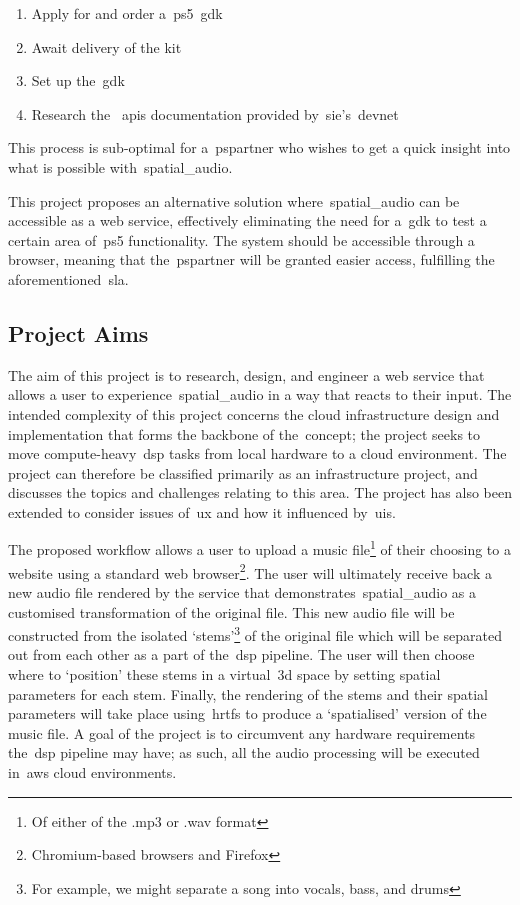 \begin{enumerate}
    \item Apply for and order a~\gls{ps5}~\gls{gdk}
    \item Await delivery of the kit
    \item Set up the~\gls{gdk}
    \item Research the ~\glspl{api} documentation provided by~\gls{sie}'s~\gls{devnet}
\end{enumerate}

This process is sub-optimal for a~\gls{pspartner} who wishes to get a quick insight into what is possible with~\gls{spatial_audio}.

This project proposes an alternative solution where~\gls{spatial_audio} can be accessible as a web service,
effectively eliminating the need for a~\gls{gdk} to test a certain area of~\gls{ps5} functionality.
The system should be accessible through a browser, meaning that the~\gls{pspartner} will be granted easier access, fulfilling the aforementioned~\gls{sla}.

\subsection{Project Aims}\label{subsec:aims}

The aim of this project is to research, design, and engineer a web service that allows a user to experience~\gls{spatial_audio} in a way that reacts to their input.
The intended complexity of this project concerns the cloud infrastructure design and implementation that forms the backbone of the\textit{}~concept;
the project seeks to move compute-heavy~\gls{dsp} tasks from local hardware to a cloud environment.
The project can therefore be classified primarily as an infrastructure project, and discusses the topics and challenges relating to this area.
The project has also been extended to consider issues of~\gls{ux} and how it influenced by~\glspl{ui}.

The proposed workflow allows a user
to upload a music file\footnote{Of either of the .mp3 or .wav format} of their choosing to a website using a standard web browser\footnote{Chromium-based browsers and Firefox}.
The user will ultimately receive back a new audio file rendered by the service that demonstrates~\gls{spatial_audio} as a customised transformation of the original file.
This new audio file will be constructed from the isolated `stems'\footnote{For example, we might separate a song into vocals, bass, and drums} of the original file which will be separated out from each other as a part of the~\gls{dsp} pipeline.
The user will then choose where to `position' these stems in a virtual~\gls{3d} space by setting spatial parameters for each stem.
Finally, the rendering of the stems and their spatial parameters will take place using~\glspl{hrtf} to produce a `spatialised' version of the music file.
A goal of the project is to circumvent any hardware requirements the~\gls{dsp} pipeline may have;
as such, all the audio processing will be executed in~\gls{aws} cloud environments.

